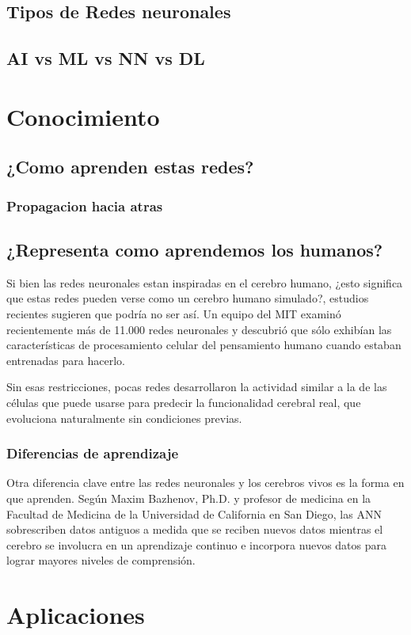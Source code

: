 \documentclass[runningheads]{llncs} %
\begin{document}
\subsection{Tipos de Redes neuronales}
\subsection{AI vs ML vs NN vs DL}
\section{Conocimiento}
\subsection{¿Como aprenden estas redes?}
\subsubsection{Propagacion hacia atras}
\subsection{¿Representa como aprendemos los humanos?}
Si bien las redes neuronales estan inspiradas en el cerebro humano, ¿esto significa 
que estas redes pueden verse como un cerebro humano simulado?, estudios recientes sugieren 
que podría no ser así. Un equipo del MIT examinó recientemente más de 11.000 redes neuronales 
y descubrió que sólo exhibían las características de procesamiento celular del pensamiento 
humano cuando estaban entrenadas para hacerlo. 

Sin esas restricciones, pocas redes desarrollaron la actividad similar a la de las células 
que puede usarse para predecir la funcionalidad cerebral real, que evoluciona naturalmente 
sin condiciones previas. \cite{NNvsANN}

\subsubsection{Diferencias de aprendizaje} 
Otra diferencia clave entre las redes neuronales y los cerebros vivos es la forma 
en que aprenden. Según Maxim Bazhenov, Ph.D. y profesor de medicina en la 
Facultad de Medicina de la Universidad de California en San Diego, 
las ANN sobrescriben datos antiguos a medida que se reciben nuevos datos mientras 
el cerebro se involucra en un aprendizaje continuo e incorpora nuevos datos para lograr 
mayores niveles de comprensión. \cite{NNvsANN}

\section{Aplicaciones}
\end{document}
